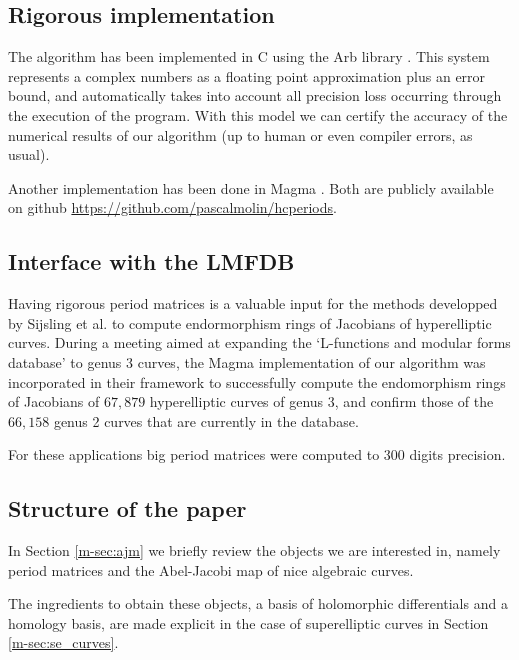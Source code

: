 \documentclass[main.tex]{subfiles}
\begin{document}
  \subsection{Rigorous implementation}
  \label{subsec:arb}

  The algorithm has been implemented in C using the Arb library \cite{Johansson2013arb}.
  This system represents a complex numbers as a floating point approximation
  plus an error bound, and automatically
  takes into account all precision loss occurring through the
  execution of the program. With this model we can certify
  the accuracy of the numerical results of our algorithm (up to human or even
  compiler errors, as usual).

  Another implementation has been done in Magma \cite{Magma}. Both are publicly available
  on github \url{https://github.com/pascalmolin/hcperiods}.

  \subsection{Interface with the LMFDB}

  Having rigorous period matrices is a valuable input for the methods developped by
  Sijsling et al. \cite{CMSVEndos} to compute endormorphism rings of Jacobians of hyperelliptic
  curves.
  During a meeting aimed at expanding the `L-functions and modular forms database' \cite[LMFDB]{lmfdb}
  to genus $3$ curves, the Magma implementation of our algorithm was incorporated in their framework
  to successfully compute the endomorphism rings of Jacobians of $67,879$ hyperelliptic
  curves of genus $3$, and confirm those of the $66,158$ genus
  2 curves that are currently in the database.

  For these applications big period matrices were computed to $300$ digits precision.

  \subsection{Structure of the paper}

  In Section \ref{m-sec:ajm} we briefly review the objects we are interested
  in, namely period matrices and the Abel-Jacobi map of nice algebraic curves.

  The ingredients to obtain these objects, a basis of holomorphic differentials
  and a homology basis, are made explicit in the case of superelliptic curves
  in Section \ref{m-sec:se_curves}.
\end{document}
